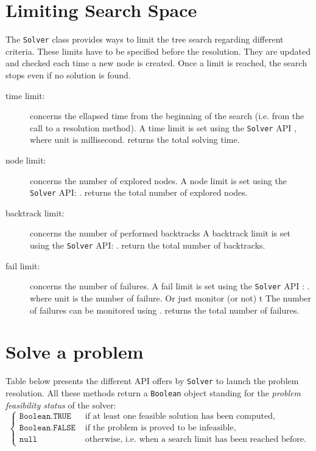 \section{Limiting Search Space}\label{solver:limitingsearchspace}\hypertarget{solver:limitingsearchspace}{}
The \texttt{Solver} class provides ways to limit the tree search regarding different criteria.
These limits have to be specified before the resolution. They are updated and checked each time a new node is created. 
 Once a limit is reached, the search stops even if no solution is found.
\begin{description}
\item[time limit:] concerns the ellapsed time from the beginning of the search (i.e. from the call to a resolution method).
A time limit is set using the \texttt{Solver} API , where unit is millisecond. 
 returns the total solving time. 
\item[node limit:] concerns the number of explored nodes.
A node limit is set using the \texttt{Solver} API: .
 returns the total number of explored nodes.
\item[backtrack limit:] concerns the number of performed backtracks 
A backtrack limit is set using the \texttt{Solver} API: .
 return the total number of backtracks.
\item[fail limit:] concerns the number of failures.
A fail limit is set using the \texttt{Solver} API : .
 where unit is the number of failure. Or just monitor (or not) t
The number of failures can be monitored using .
 returns the total number of failures.
\end{description}


\section{Solve a problem}\label{solver:solveaproblem}\hypertarget{solver:solveaproblem}{}

Table below presents the different API offers by \texttt{Solver} to launch the problem resolution. All these methods return a \texttt{Boolean} object standing for the \emph{problem feasibility status} of the solver:
$$\begin{cases}
  \texttt{Boolean.TRUE} &\text{ if at least one feasible solution has been computed},\\
  \texttt{Boolean.FALSE} &\text{ if the problem is proved to be infeasible},\\
  \texttt{null} &\text{ otherwise, i.e. when a search limit has been reached before.}
\end{cases}$$

